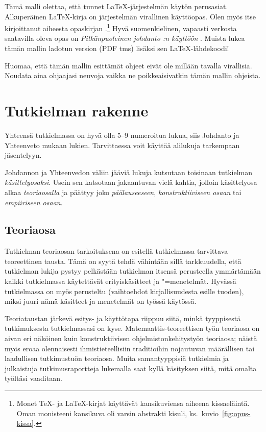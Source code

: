 \documentclass[utf8]{gradu3}
\begin{document}
Tämä malli olettaa, että tunnet \LaTeX-järjestelmän käytön perusasiat.
Alkuperäinen \LaTeX-kirja \parencite{lamport94:_latex} on järjestelmän
virallinen käyttöopas.  Olen myös itse kirjoittanut aiheesta
opaskirjan \parencite{kaijanaho03:_latex_ams_latex}.\footnote{Monet
  \TeX- ja \LaTeX-kirjat käyttävät kansikuviensa aiheena kissaeläintä.
  Oman monisteeni kansikuva oli varsin abstrakti kisuli,
  ks.~kuvio~\ref{fig:opus-kissa}.}  Hyvä suomenkielinen, vapaasti
verkosta saatavilla oleva opas on \textit{Pitkänpuoleinen johdanto
  \LaTeXe:n käyttöön} \parencite{oetiker:_pitka_latex}.  Muista lukea
tämän mallin ladotun version (PDF tms) lisäksi sen \LaTeX-lähdekoodi!

Huomaa, että tämän mallin esittämät ohjeet eivät ole millään tavalla
virallisia.  Noudata aina ohjaajasi neuvoja vaikka ne poikkeaisivatkin
tämän mallin ohjeista.

\chapter{Tutkielman rakenne}

Yhteensä tutkielmassa on hyvä olla 5--9 numeroitua
lukua, siis Johdanto ja Yhteenveto mukaan lukien.  Tarvittaessa voit
käyttää alilukuja tarkempaan jäsentelyyn.

Johdannon ja Yhteenvedon väliin jääviä lukuja kutsutaan toisinaan
tutkielman \textit{käsittelyosaksi}.  Usein sen katsotaan jakaantuvan
vielä kahtia, jolloin käsittelyosa alkaa \textit{teoriaosalla} ja
päättyy joko \textit{päälauseeseen}, \textit{konstruktiiviseen osaan}
tai \textit{empiiriseen osaan}.

\section{Teoriaosa}

Tutkielman teoriaosan tarkoituksena on esitellä tutkielmassa
tarvittava teoreettinen tausta.  Tämä on syytä tehdä vähintään sillä
tarkkuudella, että tutkielman lukija pystyy pelkästään tutkielman
itsensä perusteella ymmärtämään kaikki tutkielmassa käytettävät
erityiskäsitteet ja "=menetelmät.  Hyvässä tutkielmassa on myös
perusteltu (vaihtoehdot kirjallisuudesta esille tuoden), miksi juuri
nämä käsitteet ja menetelmät on työssä käytössä.

Teoriataustan järkevä esitys- ja käyttötapa riippuu siitä, minkä
tyyppisestä tutkimuksesta tutkielmassasi on kyse.
Matemaattis-teoreettisen työn teoriaosa on aivan eri näköinen kuin
konstruktiivisen ohjelmistonkehitystyön teoriaosa; näistä myös eroaa
olennaisesti ihmistieteellisiin traditioihin nojautuvan määrällisen
tai laadullisen tutkimustuön teoriaosa.  Muita samantyyppisiä
tutkielmia ja julkaistuja tutkimusraportteja lukemalla saat kyllä
käsityksen siitä, mitä omalta työltäsi vaaditaan.
\end{document}
